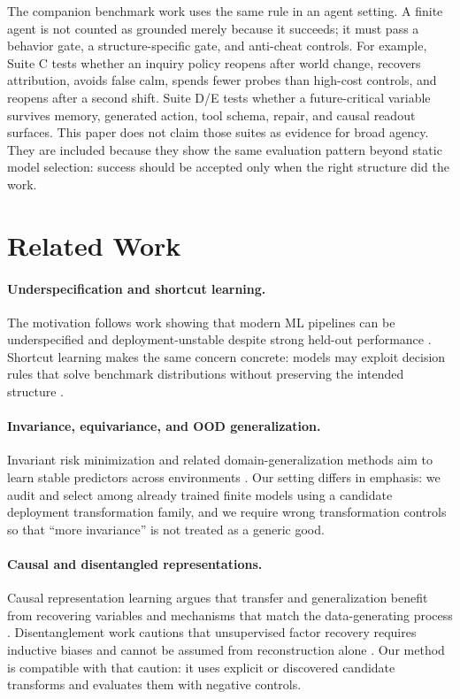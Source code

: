 \documentclass[10pt,twocolumn]{article}
\begin{document}
The companion benchmark work uses the same rule in an agent setting. A finite
agent is not counted as grounded merely because it succeeds; it must pass a
behavior gate, a structure-specific gate, and anti-cheat controls. For example,
Suite C tests whether an inquiry policy reopens after world change, recovers
attribution, avoids false calm, spends fewer probes than high-cost controls, and
reopens after a second shift. Suite D/E tests whether a future-critical variable
survives memory, generated action, tool schema, repair, and causal readout
surfaces. This paper does not claim those suites as evidence for broad agency.
They are included because they show the same evaluation pattern beyond static
model selection: success should be accepted only when the right structure did
the work.

\section{Related Work}

\paragraph{Underspecification and shortcut learning.}
The motivation follows work showing that modern ML pipelines can be
underspecified and deployment-unstable despite strong held-out performance
\citep{damour2022underspecification}. Shortcut learning makes the same concern
concrete: models may exploit decision rules that solve benchmark distributions
without preserving the intended structure \citep{geirhos2020shortcut}.

\paragraph{Invariance, equivariance, and OOD generalization.}
Invariant risk minimization and related domain-generalization methods aim to
learn stable predictors across environments \citep{arjovsky2019invariant}. Our
setting differs in emphasis: we audit and select among already trained finite
models using a candidate deployment transformation family, and we require wrong
transformation controls so that ``more invariance'' is not treated as a generic
good.

\paragraph{Causal and disentangled representations.}
Causal representation learning argues that transfer and generalization benefit
from recovering variables and mechanisms that match the data-generating process
\citep{scholkopf2021toward, brehmer2022weakly}. Disentanglement work cautions
that unsupervised factor recovery requires inductive biases and cannot be
assumed from reconstruction alone \citep{locatello2019challenging}. Our method
is compatible with that caution: it uses explicit or discovered candidate
transforms and evaluates them with negative controls.
\end{document}
